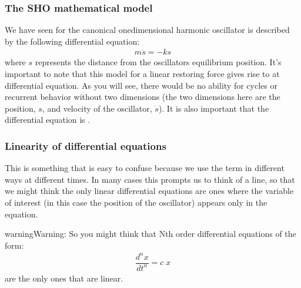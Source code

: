 \documentclass[letterpaper,10pt,english]{jupyterBook}
\begin{document}
\subsubsection{The SHO mathematical model}
\label{\detokenize{content/2_oscillations/activity-SHO_and_dynamical_systems:the-sho-mathematical-model}}
\sphinxAtStartPar
We have seen for the canonical one\sphinxhyphen{}dimensional harmonic oscillator is described by the following  differential equation:
\begin{equation*}
\begin{split}m\ddot{s} = -k{s}\end{split}
\end{equation*}
\sphinxAtStartPar
where \(s\) represents the distance from the oscillators equilibrium position. It’s important to note that this model for a linear restoring force gives rise to at  differential equation. As you will see, there would be no ability for cycles or recurrent behavior without two dimensions (the two dimensions here are the position, \(s\), and velocity of the oscillator, \(\dot{s}\)). It is also important that the differential equation is .


\subsubsection{Linearity of differential equations}
\label{\detokenize{content/2_oscillations/activity-SHO_and_dynamical_systems:linearity-of-differential-equations}}
\sphinxAtStartPar
This is something that is easy to confuse because we use the term  in different ways at different times. In many cases this prompts us to think of a line, so that we might think the only linear differential equations are ones where the variable of interest (in this case the position of the oscillator) appears only  in the equation.

\begin{sphinxadmonition}{warning}{Warning:}
\sphinxAtStartPar
So you might think that Nth order differential equations of the form:
\begin{equation*}
\begin{split}\dfrac{d^n x}{dt^n} = c\;x\end{split}
\end{equation*}
\sphinxAtStartPar
are the only ones that are linear. 
\end{sphinxadmonition}
\end{document}
